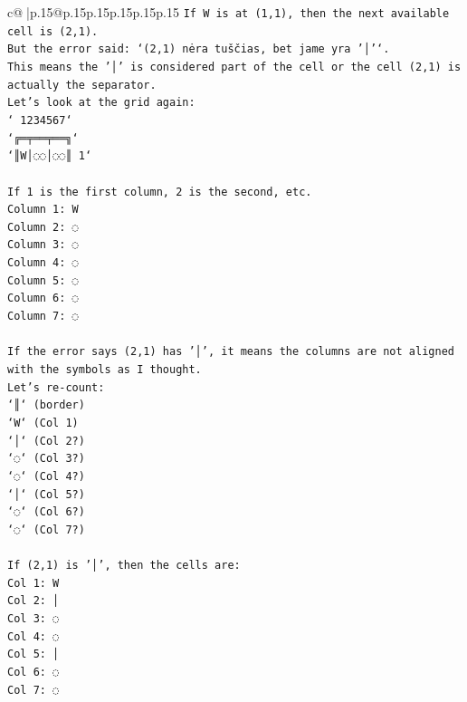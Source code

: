 \documentclass{article}
\begin{document}
{\begin{supertabular}{c@{$\;$}|p{.15\linewidth}@{}p{.15\linewidth}p{.15\linewidth}p{.15\linewidth}p{.15\linewidth}p{.15\linewidth}}
{{{\texttt{If W is at (1,1), then the next available cell is (2,1).} \\
\texttt{But the error said: `(2,1) nėra tuščias, bet jame yra '│'`.} \\
\texttt{This means the '│' is considered part of the cell or the cell (2,1) is actually the separator.} \\
\texttt{Let's look at the grid again:} \\
\texttt{` 1234567`} \\
\texttt{`╔═╤══╤══╗`} \\
\texttt{`║W│◌◌│◌◌║ 1`} \\
\\ 
\texttt{If 1 is the first column, 2 is the second, etc.} \\
\texttt{Column 1: W} \\
\texttt{Column 2: ◌} \\
\texttt{Column 3: ◌} \\
\texttt{Column 4: ◌} \\
\texttt{Column 5: ◌} \\
\texttt{Column 6: ◌} \\
\texttt{Column 7: ◌} \\
\\ 
\texttt{If the error says (2,1) has '│', it means the columns are not aligned with the symbols as I thought.} \\
\texttt{Let's re{-}count:} \\
\texttt{`║` (border)} \\
\texttt{`W` (Col 1)} \\
\texttt{`│` (Col 2?)} \\
\texttt{`◌` (Col 3?)} \\
\texttt{`◌` (Col 4?)} \\
\texttt{`│` (Col 5?)} \\
\texttt{`◌` (Col 6?)} \\
\texttt{`◌` (Col 7?)} \\
\\ 
\texttt{If (2,1) is '│', then the cells are:} \\
\texttt{Col 1: W} \\
\texttt{Col 2: │} \\
\texttt{Col 3: ◌} \\
\texttt{Col 4: ◌} \\
\texttt{Col 5: │} \\
\texttt{Col 6: ◌} \\
\texttt{Col 7: ◌} \\
\\ 
}}}
\end{supertabular}}
\end{document}
